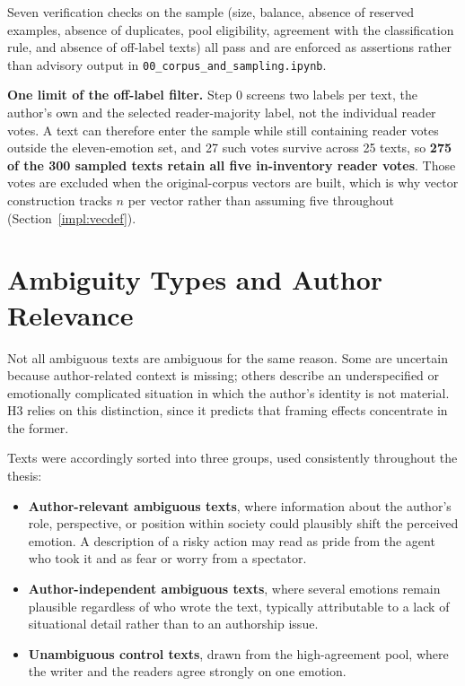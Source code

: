 Seven verification checks on the sample (size, balance, absence of reserved examples, absence
of duplicates, pool eligibility, agreement with the classification rule, and absence of off-label
texts) all pass and are enforced as assertions rather than advisory output in
\texttt{00\_corpus\_and\_sampling.ipynb}.

\textbf{One limit of the off-label filter.} Step 0 screens two labels per text, the author's
own and the selected reader-majority label, not the individual reader votes. A text can
therefore enter the sample while still containing reader votes outside the eleven-emotion set, and
27 such votes survive across 25 texts, so \textbf{275 of the 300 sampled texts retain all five
in-inventory reader votes}. Those votes are excluded when the original-corpus vectors are built,
which is why vector construction tracks $n$ per vector rather than assuming five throughout
(Section~\ref{impl:vecdef}).

\section{Ambiguity Types and Author Relevance}
\label{meth:ambiguity}

\noindent
Not all ambiguous texts are ambiguous for the same reason. Some are uncertain because
author-related context is missing; others describe an underspecified or emotionally complicated
situation in which the author's identity is not material. H3 relies on this distinction, since it
predicts that framing effects concentrate in the former.

Texts were accordingly sorted into three groups, used consistently throughout the thesis:

\begin{itemize}
    \item \textbf{Author-relevant ambiguous texts}, where information about the author's role,
    perspective, or position within society could plausibly shift the perceived emotion. A
    description of a risky action may read as pride from the agent who took it and as fear or
    worry from a spectator.

    \item \textbf{Author-independent ambiguous texts}, where several emotions remain plausible
    regardless of who wrote the text, typically attributable to a lack of situational detail
    rather than to an authorship issue.

    \item \textbf{Unambiguous control texts}, drawn from the high-agreement pool, where the writer
    and the readers agree strongly on one emotion.
\end{itemize}

